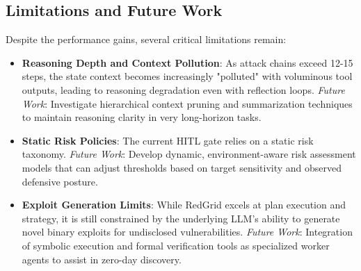 \subsection{Limitations and Future Work}
Despite the performance gains, several critical limitations remain:
\begin{itemize}
    \item \textbf{Reasoning Depth and Context Pollution}: As attack chains exceed 12-15 steps, the state context becomes increasingly "polluted" with voluminous tool outputs, leading to reasoning degradation even with reflection loops. \textit{Future Work}: Investigate hierarchical context pruning and summarization techniques to maintain reasoning clarity in very long-horizon tasks.
    \item \textbf{Static Risk Policies}: The current HITL gate relies on a static risk taxonomy. \textit{Future Work}: Develop dynamic, environment-aware risk assessment models that can adjust thresholds based on target sensitivity and observed defensive posture.
    \item \textbf{Exploit Generation Limits}: While RedGrid excels at plan execution and strategy, it is still constrained by the underlying LLM's ability to generate novel binary exploits for undisclosed vulnerabilities. \textit{Future Work}: Integration of symbolic execution and formal verification tools as specialized worker agents to assist in zero-day discovery.
\end{itemize}
